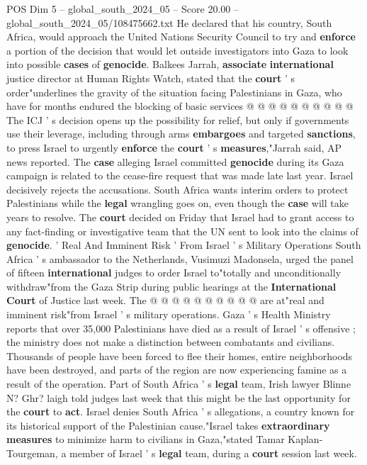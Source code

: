 \begin{textsample}{POS Dim 5 – global\_south\_2024\_05 – Score 20.00 – global\_south\_2024\_05/108475662.txt}
He declared that his country, South Africa, would approach the United Nations Security Council to try and \textbf{enforce} a portion of the decision that would let outside investigators into Gaza to look into possible \textbf{cases} of \textbf{genocide}.
Balkees Jarrah, \textbf{associate} \textbf{international} justice director at Human Rights Watch, stated that the \textbf{court} ' s order"underlines the gravity of the situation facing Palestinians in Gaza, who have for months endured the blocking of basic services @ @ @ @ @ @ @ @ @ @ The ICJ ' s decision opens up the possibility for relief, but only if governments use their leverage, including through arms \textbf{embargoes} and targeted \textbf{sanctions}, to press Israel to urgently \textbf{enforce} the \textbf{court} ' s \textbf{measures},"Jarrah said, AP news reported.
The \textbf{case} alleging Israel committed \textbf{genocide} during its Gaza campaign is related to the cease-fire request that was made late last year.
Israel decisively rejects the accusations.
South Africa wants interim orders to protect Palestinians while the \textbf{legal} wrangling goes on, even though the \textbf{case} will take years to resolve.
The \textbf{court} decided on Friday that Israel had to grant access to any fact-finding or investigative team that the UN sent to look into the claims of \textbf{genocide}. ' Real And Imminent Risk ' From Israel ' s Military Operations South Africa ' s ambassador to the Netherlands, Vusimuzi Madonsela, urged the panel of fifteen \textbf{international} judges to order Israel to"totally and unconditionally withdraw"from the Gaza Strip during public hearings at the \textbf{International} \textbf{Court} of Justice last week.
The @ @ @ @ @ @ @ @ @ @ are at"real and imminent risk"from Israel ' s military operations.
Gaza ' s Health Ministry reports that over 35,000 Palestinians have died as a result of Israel ' s offensive ; the ministry does not make a distinction between combatants and civilians.
Thousands of people have been forced to flee their homes, entire neighborhoods have been destroyed, and parts of the region are now experiencing famine as a result of the operation.
Part of South Africa ' s \textbf{legal} team, Irish lawyer Blinne N?
Ghr? laigh told judges last week that this might be the last opportunity for the \textbf{court} to \textbf{act}.
Israel denies South Africa ' s allegations, a country known for its historical support of the Palestinian cause."Israel takes \textbf{extraordinary} \textbf{measures} to minimize harm to civilians in Gaza,"stated Tamar Kaplan-Tourgeman, a member of Israel ' s \textbf{legal} team, during a \textbf{court} session last week.

\end{textsample}
